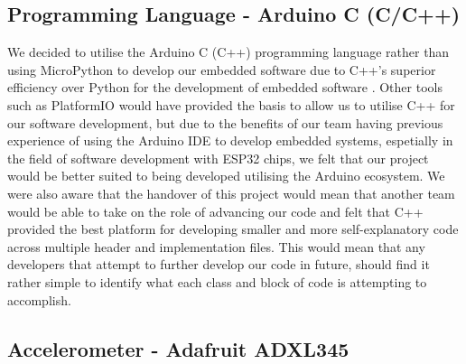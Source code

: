         \subsection{Programming Language - Arduino C (C/C++)}
        \label{subsec:programming_language}

            We decided to utilise the Arduino C (C++) programming language rather than using MicroPython to develop our embedded software due to C++'s superior efficiency over Python for the development of embedded software \cite{github_2014, dicola}. Other tools such as PlatformIO would have provided the basis to allow us to utilise C++ for our software development, but due to the benefits of our team having previous experience of using the Arduino IDE to develop embedded systems, espetially in the field of software development with ESP32 chips, we felt that our project would be better suited to being developed utilising the Arduino ecosystem. We were also aware that the handover of this project would mean that another team would be able to take on the role of advancing our code and felt that C++ provided the best platform for developing smaller and more self-explanatory code across multiple header and implementation files. This would mean that any developers that attempt to further develop our code in future, should find it rather simple to identify what each class and block of code is attempting to accomplish.

        \subsection{Accelerometer - Adafruit ADXL345}
        \label{subsec:accel}


